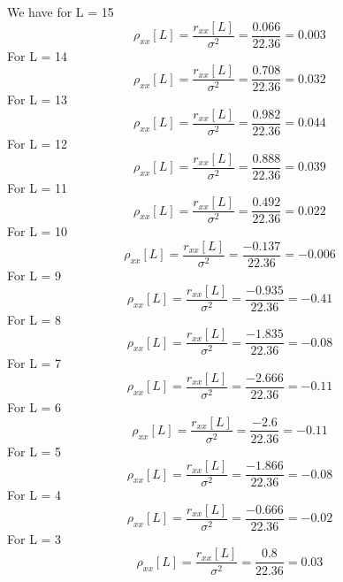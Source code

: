\documentclass{article}
\begin{document}
 
We have for L = 15
 \begin{equation}
       \rho_{xx}[L] = \frac{r_{xx}[L]}{\sigma ^2} = \frac{0.066}{22.36} = 0.003
 \end{equation}
 For L = 14
 \begin{equation}
       \rho_{xx}[L] = \frac{r_{xx}[L]}{\sigma ^2} = \frac{0.708}{22.36} = 0.032
 \end{equation}
 For L = 13
 \begin{equation}
       \rho_{xx}[L] = \frac{r_{xx}[L]}{\sigma ^2} = \frac{0.982}{22.36} = 0.044
 \end{equation}
  For L = 12
 \begin{equation}
       \rho_{xx}[L] = \frac{r_{xx}[L]}{\sigma ^2} = \frac{0.888}{22.36} = 0.039
 \end{equation}
  For L = 11
 \begin{equation}
       \rho_{xx}[L] = \frac{r_{xx}[L]}{\sigma ^2} = \frac{0.492}{22.36} = 0.022
 \end{equation}
 For L = 10
  \begin{equation}
       \rho_{xx}[L] = \frac{r_{xx}[L]}{\sigma ^2} = \frac{-0.137}{22.36} = -0.006
 \end{equation}
  For L = 9
  \begin{equation}
       \rho_{xx}[L] = \frac{r_{xx}[L]}{\sigma ^2} = \frac{-0.935}{22.36} = -0.41
 \end{equation}
  For L = 8
  \begin{equation}
       \rho_{xx}[L] = \frac{r_{xx}[L]}{\sigma ^2} = \frac{-1.835}{22.36} = -0.08
 \end{equation}
  For L = 7
  \begin{equation}
       \rho_{xx}[L] = \frac{r_{xx}[L]}{\sigma ^2} = \frac{-2.666}{22.36} = -0.11
 \end{equation}
  For L = 6
  \begin{equation}
       \rho_{xx}[L] = \frac{r_{xx}[L]}{\sigma ^2} = \frac{-2.6}{22.36} = -0.11
       \end{equation}
   For L = 5
  \begin{equation}
       \rho_{xx}[L] = \frac{r_{xx}[L]}{\sigma ^2} = \frac{-1.866}{22.36} = -0.08
 \end{equation}
   For L = 4
  \begin{equation}
        \rho_{xx}[L] = \frac{r_{xx}[L]}{\sigma ^2} = \frac{-0.666}{22.36} = -0.02
 \end{equation}
   For L = 3
  \begin{equation}
       \rho_{xx}[L] = \frac{r_{xx}[L]}{\sigma ^2} = \frac{0.8}{22.36} = 0.03
 \end{equation}
\end{document}
